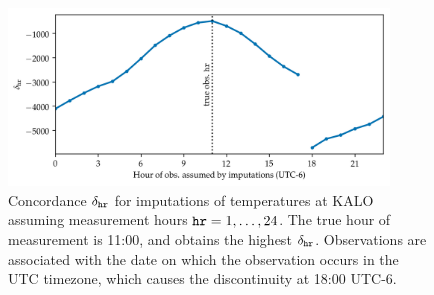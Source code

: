 \documentclass[12pt]{article}
\begin{document}
\begin{figure}[tbp]
\centering
\includegraphics[height=0.4\textheight,width=0.9\textwidth,keepaspectratio]{../figures/hr_inference.png}
\caption{
    \label{fig:hr_inference}
    Concordance \(\concordance_\hour\) for imputations of temperatures at KALO assuming measurement hours \(\hour=1,\dotsc,24\). 
    The true hour of measurement is 11:00, and obtains the highest \(\delta_\hour\).
    Observations are associated with the date on which the observation occurs in the UTC timezone, which causes the discontinuity at 18:00 UTC-6.
    }
\end{figure}
\end{document}
